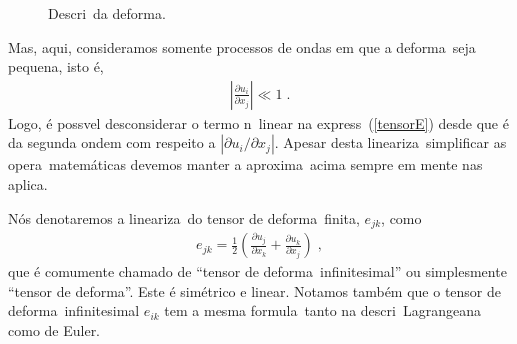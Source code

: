 \begin{figure}[!tb]
\centering
\caption{Descri\cao\ da deforma\cao.}
\label{fig:tensor-deformacao}
\end{figure}
Mas, aqui, consideramos somente processos de ondas
em que a deforma\cao\ seja pequena, isto \'e,
\begin{eqnarray}
\left|\frac{\partial u_i}{\partial x_j}\right| \ll 1 \; .
\label{def_peq}
\end{eqnarray}
Logo, \'e poss\ih vel desconsiderar o termo n\ao\ linear
na express\ao\ (\ref{tensorE}) desde que \'e da segunda
ondem com respeito a  $|\partial u_i / \partial x_j|$.
Apesar desta lineariza\cao\ simplificar as opera\coes\
matem\'aticas devemos manter a aproxima\cao\ acima sempre
em mente nas aplica\coes.

N\'os denotaremos a lineariza\cao\ do tensor de
deforma\cao\ finita, $e_{jk}$, como
\begin{eqnarray} \label{td}
e_{jk} = \frac{1}{2} \left( \frac{\partial u_j}
{\partial x_k} +\frac{\partial u_k}{\partial x_j}\right)
\; ,
\end{eqnarray}
que \'e comumente chamado de ``tensor de deforma\cao\
infinitesimal'' ou simplesmente ``tensor de deforma\cao''.
Este \'e sim\'etrico e linear. Notamos tamb\'em que o
tensor de deforma\cao\ infinitesimal $e_{ik}$ tem a mesma formula\cao\
tanto na descri\cao\ Lagrangeana como de Euler.

